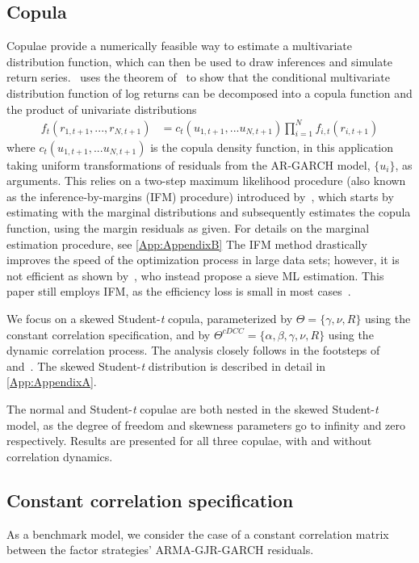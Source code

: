 \subsection{Copula}
Copulae provide a numerically feasible way to estimate a multivariate distribution function, which can then be used to draw inferences and simulate return series.~\textcite{Patton2006} uses the theorem of~\textcite{Sklar1959} to show that the conditional multivariate distribution function of log returns can be decomposed into a copula function and the product of univariate distributions
\begin{align} \label{eq:sklar}
    f_t(r_{1,t+1}, ..., r_{N, t+1}) &= c_t(u_{1, t+1}, ... u_{N, t+1}) \prod^N_{i=1} f_{i,t}(r_{i, t+1})
\end{align}
where $c_t(u_{1, t+1}, ... u_{N, t+1})$ is the copula density function, in this application taking uniform transformations of residuals from the AR-GARCH model, $\{u_i\}$, as arguments. This relies on a two-step maximum likelihood procedure (also known as the inference-by-margins (IFM) procedure) introduced by~\textcite{Joe1997}, which starts by estimating with the marginal distributions and subsequently estimates the copula function, using the margin residuals as given. For details on the marginal estimation procedure, see \autoref{App:AppendixB} The IFM method drastically improves the speed of the optimization process in large data sets; however, it is not efficient as shown by~\textcite{ChenFanTsyrennikov2006}, who instead propose a sieve ML estimation. This paper still employs IFM, as the efficiency loss is small in most cases~\autocite{Patton2006}.  

We focus on a skewed Student-\textit{t} copula, parameterized by $\Theta = \{\gamma, \nu, R\}$ using the constant correlation specification, and by $\Theta^{cDCC} = \{\alpha, \beta, \gamma, \nu, R\}$ using the dynamic correlation process. The analysis closely follows in the footsteps of~\textcite{Aielli2013} and~\textcite{ChristoffersenErrunzaJacobLanglois2012}. The skewed Student-\textit{t} distribution is described in detail in \autoref{App:AppendixA}.

The normal and Student-\textit{t} copulae are both nested in the skewed Student-\textit{t} model, as the degree of freedom and skewness parameters go to infinity and zero respectively. Results are presented for all three copulae, with and without correlation dynamics.

\subsection{Constant correlation specification}
As a benchmark model, we consider the case of a constant correlation matrix between the factor strategies' ARMA-GJR-GARCH residuals.  

